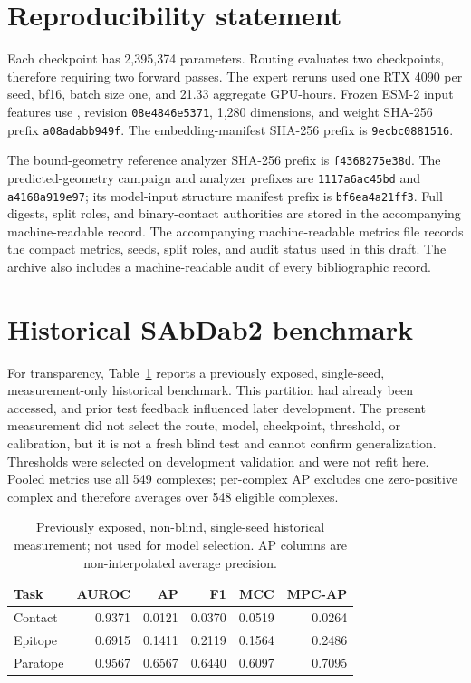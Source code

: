 \documentclass[10pt]{article}
\begin{document}
\section*{Reproducibility statement}

Each checkpoint has 2,395,374 parameters. Routing evaluates two checkpoints,
therefore requiring two forward passes. The expert reruns used one RTX 4090 per
seed, bf16, batch size one, and 21.33 aggregate GPU-hours. Frozen ESM-2 input
features use , revision
\texttt{08e4846e5371}, 1,280 dimensions, and weight SHA-256 prefix
\texttt{a08adabb949f}. The embedding-manifest SHA-256 prefix is
\texttt{9ecbc0881516}.

The bound-geometry reference analyzer SHA-256 prefix is
\texttt{f4368275e38d}. The predicted-geometry campaign and analyzer prefixes are
\texttt{1117a6ac45bd} and \texttt{a4168a919e97}; its model-input structure
manifest prefix is \texttt{bf6ea4a21ff3}. Full digests, split roles, and
binary-contact authorities are stored in the accompanying machine-readable
record.
The accompanying machine-readable metrics file records the compact metrics,
seeds, split roles, and audit status used in this draft. The archive also includes
a machine-readable audit of every bibliographic record.




\appendix
\section{Historical SAbDab2 benchmark}

For transparency, Table~\ref{tab:historical} reports a previously exposed,
single-seed, measurement-only historical benchmark. This partition had already
been accessed, and prior test feedback influenced later development. The present
measurement did not select the route, model, checkpoint, threshold, or
calibration, but it is not a fresh blind test and cannot confirm generalization.
Thresholds were selected on development validation and were not refit here.
Pooled metrics use all 549 complexes; per-complex AP excludes one zero-positive
complex and therefore averages over 548 eligible complexes.

\begin{table}[H]
\centering
\caption{Previously exposed, non-blind, single-seed historical measurement; not
used for model selection. AP columns are non-interpolated average precision.}
\label{tab:historical}
\small
\begin{tabular}{lrrrrr}
\toprule
Task & AUROC & AP & F1 & MCC & MPC-AP \\
\midrule
Contact & 0.9371 & 0.0121 & 0.0370 & 0.0519 & 0.0264 \\
Epitope & 0.6915 & 0.1411 & 0.2119 & 0.1564 & 0.2486 \\
Paratope & 0.9567 & 0.6567 & 0.6440 & 0.6097 & 0.7095 \\
\bottomrule
\end{tabular}
\end{table}
\end{document}
